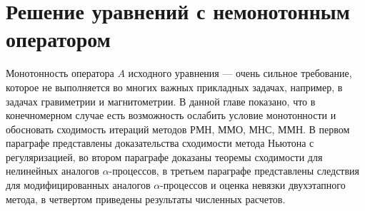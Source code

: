 \chapter{Решение уравнений с немонотонным оператором}
Монотонность оператора $A$ исходного уравнения --- очень сильное требование, которое не выполняется во многих важных прикладных задачах, например, в задачах гравиметрии и магнитометрии. В данной главе показано, что в конечномерном случае есть возможность ослабить условие монотонности и обосновать сходимость итераций методов РМН, ММО, МНС, ММН.
В первом параграфе представлены доказательства сходимости метода Ньютона с регуляризацией, во втором параграфе доказаны теоремы сходимости для нелинейных аналогов $\alpha$-процессов, в третьем параграфе представлены следствия для модифицированных аналогов $\alpha$-процессов и оценка невязки двухэтапного метода, в четвертом приведены результаты численных расчетов.

\newpage
